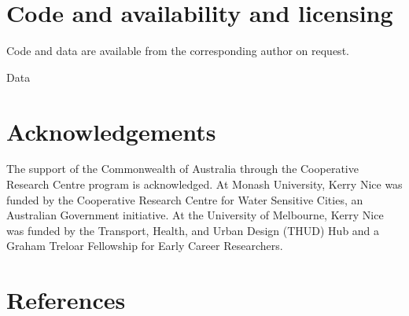 \documentclass[final,3p,times,authoryear]{elsarticle}
\begin{document}
\section{Code and availability and licensing}\label{sec:available}
Code and data are available from the corresponding author on request.

Data \citep{Nice2019Data}





\section*{Acknowledgements}
The support of the Commonwealth of Australia through the Cooperative Research Centre program is acknowledged. At Monash University, Kerry Nice was funded by the Cooperative Research Centre for Water Sensitive Cities, an Australian Government initiative. At the University of Melbourne, Kerry Nice was funded by the Transport, Health, and Urban Design (THUD) Hub and a Graham Treloar Fellowship for Early Career Researchers.
 

\section*{References}\label{sec:ref}
   
  


%
%
%


\end{document}
